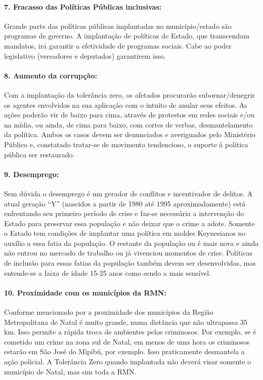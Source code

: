 \documentclass[
	12pt,				%
	openright,			%
	twoside,			%
	a4paper,			%
	chapter=TITLE,		%
	section=TITLE,		%
	subsection=TITLE,	%
	subsubsection=TITLE,%
	spanish,            %
	english,			%
	brazil				%
	]{abntex2}
\begin{document}
\paragraph*{\textbf{7. Fracasso das Políticas Públicas inclusivas:}} Grande parte das políticas públicas implantadas no município/estado são programas de governo. A implantação de políticas de Estado, que transcendam mandatos, irá garantir a efetividade de programas sociais. Cabe ao poder legislativo (vereadores e deputados) garantirem isso.
\hypertarget{T8}{}
\paragraph*{\textbf{8. Aumento da corrupção:}} Com a implantação da tolerância zero, os afetados procurarão subornar/denegrir os agentes envolvidos na sua aplicação com o intuito de anular seus efeitos. As ações poderão vir de baixo para cima, através de protestos em redes sociais e/ou na mídia, ou ainda, de cima para baixo, com cortes de verbas, desmantelamento da política. Ambos os casos devem ser denunciados e averiguados pelo Ministério Público e, constatado tratar-se de movimento tendencioso, o suporte à política pública ser restaurado.
\hypertarget{T9}{}
\paragraph*{\textbf{9. Desemprego:}} Sem dúvida o desemprego é um gerador de conflitos e incentivador de delitos. A atual geração “Y” (nascidos a partir de 1980 até 1995 aproximadamente) está enfrentando seu primeiro período de crise e faz-se necessária a intervenção do Estado para preservar essa população e não deixar que o crime a adote. Somente o Estado tem condições de implantar uma política em moldes Keynesianos no auxílio a essa fatia da população. O restante da população ou é mais nova e ainda não entrou no mercado de trabalho ou já vivenciou momentos de crise. Políticas de inclusão para essas fatias da população também devem ser desenvolvidas, mas entende-se a faixa de idade 15-25 anos como sendo a mais sensível.
\hypertarget{T10}{}
\paragraph*{\textbf{10. Proximidade com os municípios da RMN:}} Conforme mencionado por  a proximidade dos municípios da Região Metropolitana de Natal é muito grande, numa distância que não ultrapassa 35 km. Isso permite a rápida troca de ambientes pelos criminosos. Por exemplo, se é cometido um crime na zona sul de Natal, em menos de uma hora os criminosos estarão em São José do Mipibú, por exemplo. Isso praticamente desmantela a ação policial. A Tolerância Zero quando implantada não deverá visar somente o município de Natal, mas sim toda a RMN.
\end{document}
